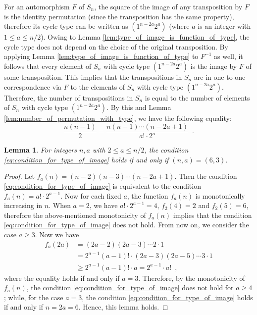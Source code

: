 \documentclass[11pt]{article}
\newtheorem{lemma}{Lemma}
\begin{document}
For an automorphism $F$ of $S_n$, the square of the image of any transposition by $F$ is the identity permutation (since the transposition has the same property), therefore its cycle type can be written as $(1^{n-2a}2^a)$ (where $a$ is an integer with $1 \leq a \leq n/2$).
Owing to Lemma \ref{lem:type_of_image_is_function_of_type}, the cycle type does not depend on the choice of the original transposition.
By applying Lemma \ref{lem:type_of_image_is_function_of_type} to $F^{-1}$ as well, it follows that every element of $S_n$ with cycle type $(1^{n-2a}2^a)$ is the image by $F$ of some transposition.
This implies that the transpositions in $S_n$ are in one-to-one correspondence via $F$ to the elements of $S_n$ with cycle type $(1^{n-2a}2^a)$.
Therefore, the number of transpositions in $S_n$ is equal to the number of elements of $S_n$ with cycle type $(1^{n-2a}2^a)$.
By this and Lemma \ref{lem:number_of_permutation_with_type}, we have the following equality:
\begin{equation}
\label{eq:condition_for_type_of_image}
\frac{ n(n-1) }{ 2 } = \frac{ n(n-1) \cdots (n-2a+1) }{ a! \cdot 2^a } \enspace.
\end{equation}

\begin{lemma}
\label{lem:equation_for_type_of_image}
For integers $n,a$ with $2 \leq a \leq n/2$, the condition \eqref{eq:condition_for_type_of_image} holds if and only if $(n,a) = (6,3)$.
\end{lemma}
\begin{proof}
Let $f_a(n) = (n-2)(n-3) \cdots (n-2a+1)$.
Then the condition \eqref{eq:condition_for_type_of_image} is equivalent to the condition $f_a(n) = a! \cdot 2^{a-1}$.
Now for each fixed $a$, the function $f_a(n)$ is monotonically increasing in $n$.
When $a = 2$, we have $a! \cdot 2^{a-1} = 4$, $f_2(4) = 2$ and $f_2(5) = 6$, therefore the above-mentioned monotonicity of $f_a(n)$ implies that the condition \eqref{eq:condition_for_type_of_image} does not hold.
From now on, we consider the case $a \geq 3$.
Now we have
\begin{displaymath}
\begin{split}
f_a(2a) &= (2a-2)(2a-3) \cdots 2 \cdot 1 \\
&= 2^{a-1} (a-1)! \cdot (2a-3)(2a-5) \cdots 3 \cdot 1 \\
&\geq 2^{a-1} (a-1)! \cdot a
= 2^{a-1} \cdot a! \enspace,
\end{split}
\end{displaymath}
where the equality holds if and only if $a = 3$.
Therefore, by the monotonicity of $f_a(n)$, the condition \eqref{eq:condition_for_type_of_image} does not hold for $a \geq 4$; while, for the case $a = 3$, the condition \eqref{eq:condition_for_type_of_image} holds if and only if $n = 2a = 6$.
Hence, this lemma holds.
\end{proof}
\end{document}
